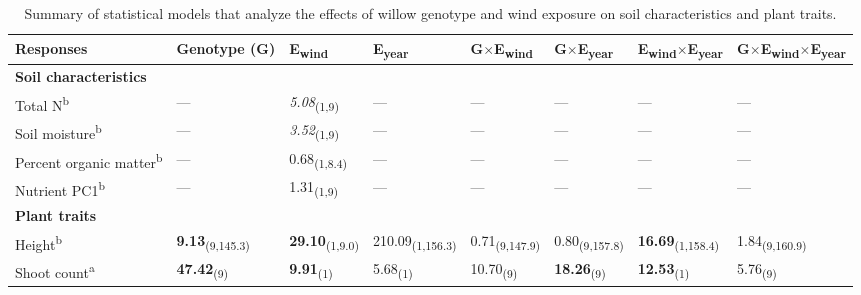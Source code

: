 \documentclass[11pt]{article}
\begin{document}
\begin{table}
\centering
\caption{Summary of statistical models that analyze the
effects of willow genotype and wind exposure on
soil characteristics and plant traits.}
\label{wSoilTrait}
\begin{tabular}{@{}llllllll@{}}
\toprule
Responses                  & Genotype (G)  & E\textsubscript{wind}        & E\textsubscript{year}           & G$\times$E\textsubscript{wind}       & G$\times$E\textsubscript{year}       & E\textsubscript{wind}$\times$E\textsubscript{year}    & G$\times$E\textsubscript{wind}$\times$E\textsubscript{year} \\
\midrule
\textbf{Soil characteristics}       &               &              &                 &               &               &                &               \\
Total N\textsuperscript{b}                   & ---             & \textit{5.08}\textsubscript{(1,9)}    & ---               & ---             & ---             & ---              & ---             \\
Soil moisture\textsuperscript{b}             & ---             & \textit{3.52}\textsubscript{(1,9)}    & ---               & ---             & ---             & ---              & ---             \\
Percent organic matter\textsuperscript{b}    & ---             & 0.68\textsubscript{(1,8.4)}  & ---               & ---             & ---             & ---              & ---             \\
Nutrient PC1\textsuperscript{b}              & ---             & 1.31\textsubscript{(1,9)}    & ---               & ---             & ---             & ---              & ---             \\
\textbf{Plant traits}               &               &              &                 &               &               &                &               \\
Height\textsuperscript{b}                    & \textbf{9.13}\textsubscript{(9,145.3)} & \textbf{29.10}\textsubscript{(1,9.0)} & 210.09\textsubscript{(1,156.3)} & 0.71\textsubscript{(9,147.9)} & 0.80\textsubscript{(9,157.8)} & \textbf{16.69}\textsubscript{(1,158.4)} & 1.84\textsubscript{(9,160.9)} \\
Shoot count\textsuperscript{a}               & \textbf{47.42}\textsubscript{(9)}      & \textbf{9.91}\textsubscript{(1)}      & 5.68\textsubscript{(1)}         & 10.70\textsubscript{(9)}      & \textbf{18.26}\textsubscript{(9)}      & \textbf{12.53}\textsubscript{(1)}       & 5.76\textsubscript{(9)}       \\

\end{tabular}
\end{table}
\end{document}
